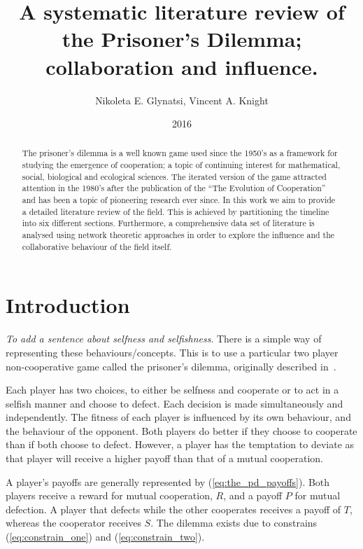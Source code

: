 \documentclass{article}
\title{A systematic literature review of the Prisoner's Dilemma; collaboration and influence.}
\author{Nikoleta E. Glynatsi, Vincent A. Knight}
\date{2016}
\theoremstyle{definition}
\begin{document}
\maketitle

\begin{abstract}
    The prisoner's dilemma is a well known game used since the 1950's as a framework
    for studying the emergence of cooperation; a topic of continuing interest
    for mathematical, social, biological and ecological sciences. The iterated version
    of the game attracted attention in the 1980's after
    the publication of the ``The Evolution of Cooperation'' and has been a topic
    of pioneering research ever since. In this work we aim to provide a detailed
    literature review of the field. This is achieved by partitioning the timeline into six different
    sections. Furthermore, a comprehensive data set of literature is analysed
    using network theoretic approaches in order to explore the influence and the
    collaborative behaviour of the field itself.
\end{abstract}

\section{Introduction}\label{section:introduction}

\textit{To add a sentence about selfness and selfishness}. There is a simple
way of representing these behaviours/concepts. This is to use a
particular two player non-cooperative game called the prisoner's dilemma, originally
described in~\cite{Flood1958}.

Each player has two choices, to either be selfness and cooperate or to act in a
selfish manner and choose to defect. Each decision is made simultaneously and independently.
The fitness of each player is influenced by its own behaviour, and the behaviour
of the opponent. Both players do better if they choose to cooperate than if both
choose to defect. However, a player has the temptation to deviate as that player will
receive a higher payoff than that of a mutual cooperation.

A player's payoffs are generally represented by (\ref{eq:the_pd_payoffs}). Both
players receive a reward for mutual cooperation, \(R\), and a payoff \(P\) for
mutual defection. A player that defects while the other cooperates receives a payoff of
\(T\), whereas the cooperator receives \(S\). The dilemma exists due
to constrains (\ref{eq:constrain_one}) and (\ref{eq:constrain_two}).
\end{document}
